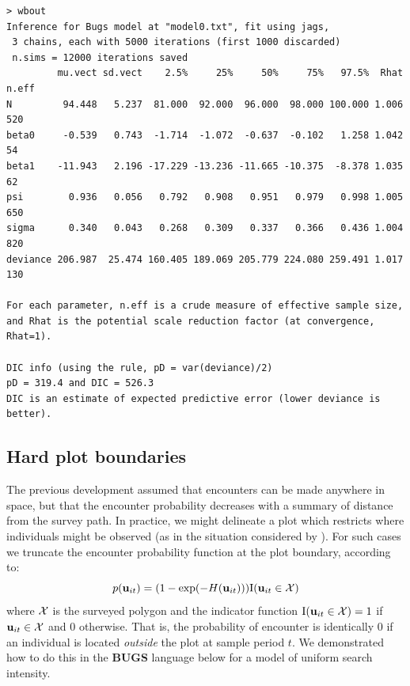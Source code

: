 \begin{verbatim}
> wbout
Inference for Bugs model at "model0.txt", fit using jags,
 3 chains, each with 5000 iterations (first 1000 discarded)
 n.sims = 12000 iterations saved
         mu.vect sd.vect    2.5%     25%     50%     75%   97.5%  Rhat n.eff
N         94.448   5.237  81.000  92.000  96.000  98.000 100.000 1.006   520
beta0     -0.539   0.743  -1.714  -1.072  -0.637  -0.102   1.258 1.042    54
beta1    -11.943   2.196 -17.229 -13.236 -11.665 -10.375  -8.378 1.035    62
psi        0.936   0.056   0.792   0.908   0.951   0.979   0.998 1.005   650
sigma      0.340   0.043   0.268   0.309   0.337   0.366   0.436 1.004   820
deviance 206.987  25.474 160.405 189.069 205.779 224.080 259.491 1.017   130

For each parameter, n.eff is a crude measure of effective sample size,
and Rhat is the potential scale reduction factor (at convergence, Rhat=1).

DIC info (using the rule, pD = var(deviance)/2)
pD = 319.4 and DIC = 526.3
DIC is an estimate of expected predictive error (lower deviance is better).
\end{verbatim}




\subsection{Hard plot boundaries}

The previous development assumed that encounters can be made anywhere
in space, but that the encounter probability decreases with a summary
of distance from the survey path. In practice, we might delineate a
plot which restricts where individuals might be observed (as in the
situation considered by \citet{royle_young:2008}).  For such cases we
truncate the encounter probability function at the plot boundary,
according to:
\begin{equation}
p({\bf u}_{it}) = (1- \exp(-H({\bf u}_{it}))) \mbox{I}({\bf u}_{it} \in {\cal X})
\label{search-encounter.eq.hardplot}
\end{equation}
where ${\cal X}$ is the surveyed polygon and the indicator function
$\mbox{I}({\bf u}_{it} \in {\cal X}) = 1$ if ${\bf u}_{it} \in {\cal
  X}$ and 0 otherwise.  That is, the probability of encounter is
identically 0 if an individual is located {\it outside} the plot at
sample period $t$.  We demonstrated how to do this in the {\bf BUGS}
language below for a model of uniform search intensity.


